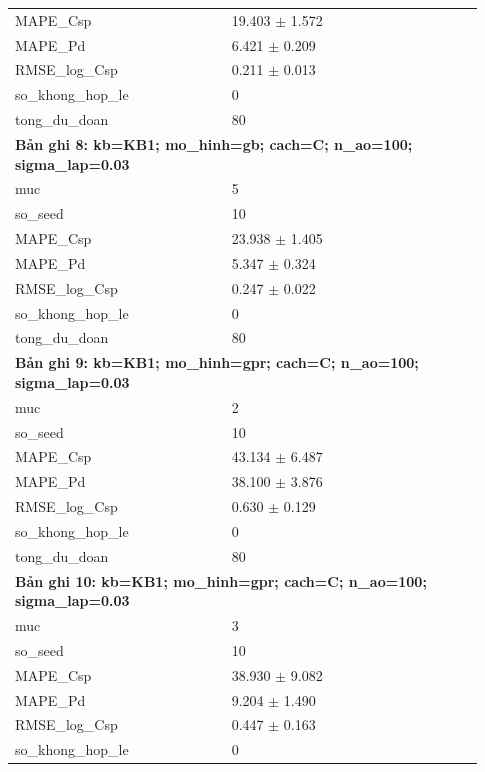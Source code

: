 \begin{longtable}{p{0.43\linewidth}p{0.50\linewidth}}
MAPE\_\allowbreak Csp & 19.403 $\pm$ 1.572 \\
MAPE\_\allowbreak Pd & 6.421 $\pm$ 0.209 \\
RMSE\_\allowbreak log\_\allowbreak Csp & 0.211 $\pm$ 0.013 \\
so\_\allowbreak khong\_\allowbreak hop\_\allowbreak le & 0 \\
tong\_\allowbreak du\_\allowbreak doan & 80 \\
\midrule
\multicolumn{2}{p{0.95\linewidth}}{\textbf{Bản ghi 8: kb=KB1; mo\_hinh=gb; cach=C; n\_ao=100; sigma\_lap=0.03}} \\
muc & 5 \\
so\_\allowbreak seed & 10 \\
MAPE\_\allowbreak Csp & 23.938 $\pm$ 1.405 \\
MAPE\_\allowbreak Pd & 5.347 $\pm$ 0.324 \\
RMSE\_\allowbreak log\_\allowbreak Csp & 0.247 $\pm$ 0.022 \\
so\_\allowbreak khong\_\allowbreak hop\_\allowbreak le & 0 \\
tong\_\allowbreak du\_\allowbreak doan & 80 \\
\midrule
\multicolumn{2}{p{0.95\linewidth}}{\textbf{Bản ghi 9: kb=KB1; mo\_hinh=gpr; cach=C; n\_ao=100; sigma\_lap=0.03}} \\
muc & 2 \\
so\_\allowbreak seed & 10 \\
MAPE\_\allowbreak Csp & 43.134 $\pm$ 6.487 \\
MAPE\_\allowbreak Pd & 38.100 $\pm$ 3.876 \\
RMSE\_\allowbreak log\_\allowbreak Csp & 0.630 $\pm$ 0.129 \\
so\_\allowbreak khong\_\allowbreak hop\_\allowbreak le & 0 \\
tong\_\allowbreak du\_\allowbreak doan & 80 \\
\midrule
\multicolumn{2}{p{0.95\linewidth}}{\textbf{Bản ghi 10: kb=KB1; mo\_hinh=gpr; cach=C; n\_ao=100; sigma\_lap=0.03}} \\
muc & 3 \\
so\_\allowbreak seed & 10 \\
MAPE\_\allowbreak Csp & 38.930 $\pm$ 9.082 \\
MAPE\_\allowbreak Pd & 9.204 $\pm$ 1.490 \\
RMSE\_\allowbreak log\_\allowbreak Csp & 0.447 $\pm$ 0.163 \\
so\_\allowbreak khong\_\allowbreak hop\_\allowbreak le & 0 \\

\end{longtable}
